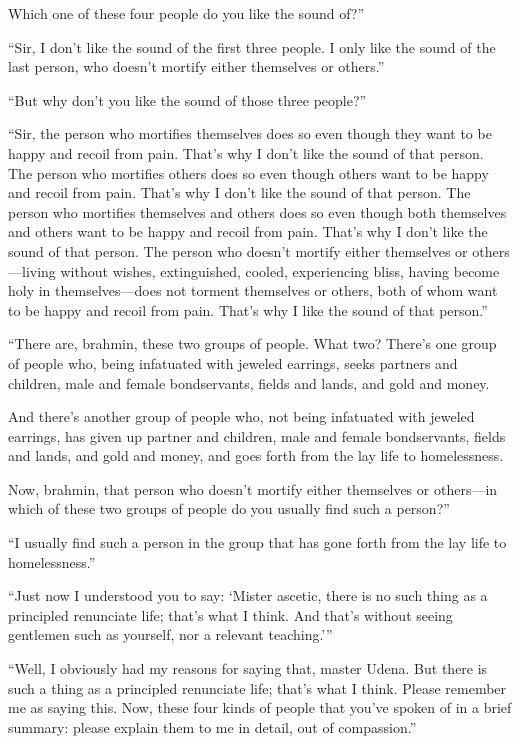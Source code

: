 \documentclass[12pt,openany]{book}%
\begin{document}
Which one of these four people do you like the sound of?” 

“Sir, I don’t like the sound of the first three people. I only like the sound of the last person, who doesn’t mortify either themselves or others.” 

“But why don’t you like the sound of those three people?” 

“Sir, the person who mortifies themselves does so even though they want to be happy and recoil from pain. That’s why I don’t like the sound of that person. The person who mortifies others does so even though others want to be happy and recoil from pain. That’s why I don’t like the sound of that person. The person who mortifies themselves and others does so even though both themselves and others want to be happy and recoil from pain. That’s why I don’t like the sound of that person. The person who doesn’t mortify either themselves or others—living without wishes, extinguished, cooled, experiencing bliss, having become holy in themselves—does not torment themselves or others, both of whom want to be happy and recoil from pain. That’s why I like the sound of that person.” 

“There are, brahmin, these two groups of people. What two? There’s one group of people who, being infatuated with jeweled earrings, seeks partners and children, male and female bondservants, fields and lands, and gold and money. 

And there’s another group of people who, not being infatuated with jeweled earrings, has given up partner and children, male and female bondservants, fields and lands, and gold and money, and goes forth from the lay life to homelessness. 

Now, brahmin, that person who doesn’t mortify either themselves or others—in which of these two groups of people do you usually find such a person?” 

“I usually find such a person in the group that has gone forth from the lay life to homelessness.” 

“Just now I understood you to say: ‘Mister ascetic, there is no such thing as a principled renunciate life; that’s what I think. And that’s without seeing gentlemen such as yourself, nor a relevant teaching.’” 

“Well, I obviously had my reasons for saying that, master Udena. But there is such a thing as a principled renunciate life; that’s what I think. Please remember me as saying this. Now, these four kinds of people that you’ve spoken of in a brief summary: please explain them to me in detail, out of compassion.” 
\end{document}
